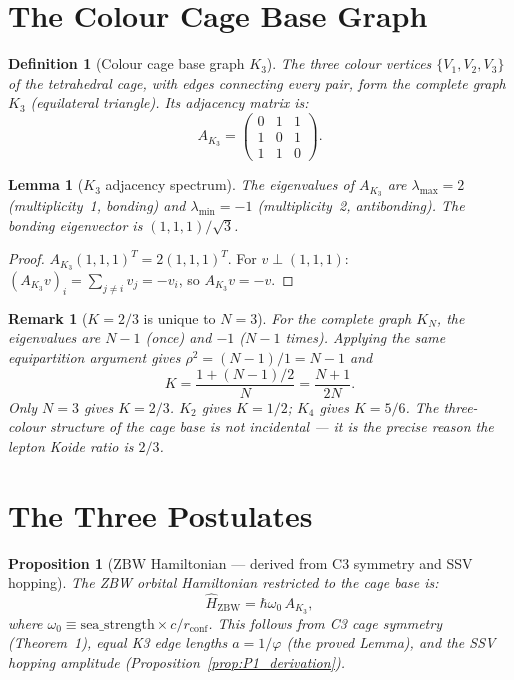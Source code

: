 \documentclass[11pt]{article}
\newtheorem{lemma}[theorem]{Lemma}
\newtheorem{definition}{Definition}[section]
\newtheorem{remark}{Remark}[section]
\newtheorem{proposition}[theorem]{Proposition}
\newcommand{\ZBW}{\mathrm{ZBW}}
\begin{document}
\section{The Colour Cage Base Graph}

\begin{definition}[Colour cage base graph $K_3$]
The three colour vertices $\{V_1,V_2,V_3\}$ of the tetrahedral cage,
with edges connecting every pair, form the complete graph $K_3$
(equilateral triangle).  Its adjacency matrix is:
\[
A_{K_3} = \begin{pmatrix}0&1&1\\1&0&1\\1&1&0\end{pmatrix}.
\]
\end{definition}

\begin{lemma}[$K_3$ adjacency spectrum]
\label{lem:K3spec}
The eigenvalues of $A_{K_3}$ are
$\lambda_{\max} = 2$ (multiplicity~1, bonding) and
$\lambda_{\min} = -1$ (multiplicity~2, antibonding).
The bonding eigenvector is $(1,1,1)/\sqrt{3}$.
\end{lemma}

\begin{proof}
$A_{K_3}(1,1,1)^T = 2(1,1,1)^T$.  For $v\perp(1,1,1)$:
$(A_{K_3}v)_i = \sum_{j\neq i}v_j = -v_i$, so $A_{K_3}v = -v$.
\end{proof}

\begin{remark}[$K = 2/3$ is unique to $N=3$]
For the complete graph $K_N$, the eigenvalues are $N-1$ (once) and $-1$
($N-1$ times).  Applying the same equipartition argument gives
$\rho^2 = (N-1)/1 = N-1$ and
\[
K = \frac{1 + (N-1)/2}{N} = \frac{N+1}{2N}.
\]
Only $N=3$ gives $K=2/3$.  $K_2$ gives $K=1/2$; $K_4$ gives $K=5/6$.
The three-colour structure of the cage base is not incidental --- it is the
precise reason the lepton Koide ratio is $2/3$.
\end{remark}

\section{The Three Postulates}

\begin{proposition}[$\ZBW$ Hamiltonian — derived from C3 symmetry and SSV hopping]
\label{post:H}
The ZBW orbital Hamiltonian restricted to the cage base is:
\[
\hat{H}_{\ZBW} = \hbar\omega_0\, A_{K_3},
\]
where $\omega_0 \equiv \mathrm{sea\_strength}\times c/r_{\mathrm{conf}}$.
This follows from C3 cage symmetry (Theorem~1), equal K3 edge lengths
$a = 1/\varphi$ (the proved Lemma), and the SSV hopping amplitude
(Proposition~\ref{prop:P1_derivation}).
\end{proposition}
\end{document}

